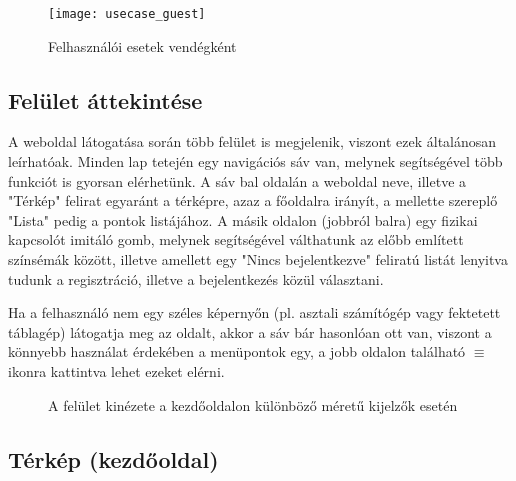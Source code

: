 \begin{figure}[H]
	\centering
	\texttt{[image: usecase\_guest]}
	\caption{Felhasználói esetek vendégként}
	\label{fig:usecase_guest}
\end{figure}

\subsection{Felület áttekintése}
\label{subsec:nav_guest}

A weboldal látogatása során több felület is megjelenik, viszont ezek általánosan leírhatóak. Minden lap tetején egy navigációs sáv van, melynek segítségével több funkciót is gyorsan elérhetünk. A sáv bal oldalán a weboldal neve, illetve a "Térkép" felirat egyaránt a térképre, azaz a főoldalra irányít, a mellette szereplő "Lista" pedig a pontok listájához. A másik oldalon (jobbról balra) egy fizikai kapcsolót imitáló gomb, melynek segítségével válthatunk az előbb említett színsémák között, illetve amellett egy "Nincs bejelentkezve" feliratú listát lenyitva tudunk a regisztráció, illetve a bejelentkezés közül választani.\par
Ha a felhasználó nem egy széles képernyőn (pl. asztali számítógép vagy fektetett táblagép) látogatja meg az oldalt, akkor a sáv bár hasonlóan ott van, viszont a könnyebb használat érdekében a menüpontok egy, a jobb oldalon található \hspace{0.1cm}\boldmath\(\equiv\)\hspace{0.1cm} ikonra kattintva lehet ezeket elérni.

\begin{figure}[H]
	\centering
	\hspace{5pt}
		\hspace{5pt}
	\caption{A felület kinézete a kezdőoldalon különböző méretű kijelzők esetén}
	\label{fig:map_guest}
\end{figure}

\subsection{Térkép (kezdőoldal)}
\label{subsec:map_guest}

